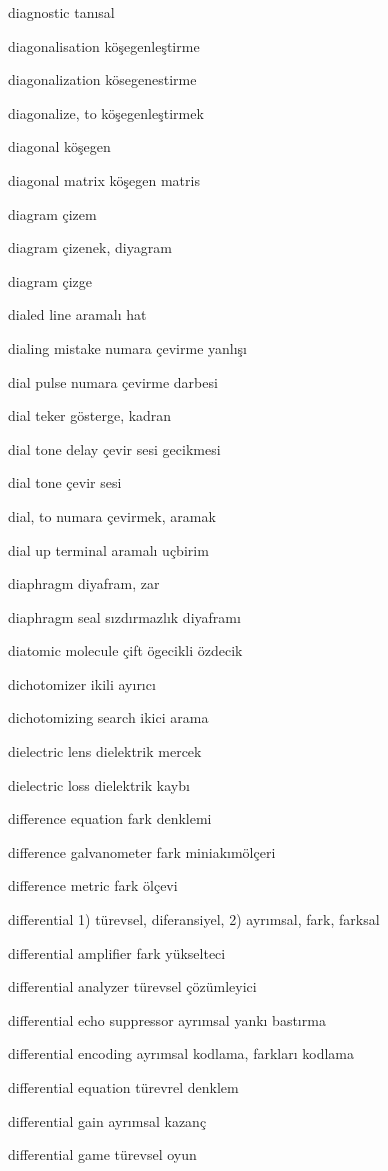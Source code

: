 \documentclass[12pt,fleqn]{article}\usepackage{../../common}
\begin{document}
diagnostic tanısal

diagonalisation köşegenleştirme

diagonalization kösegenestirme

diagonalize, to köşegenleştirmek

diagonal köşegen

diagonal matrix köşegen matris

diagram çizem

diagram çizenek, diyagram

diagram çizge

dialed line aramalı hat

dialing mistake numara çevirme yanlışı

dial pulse numara çevirme darbesi

dial teker gösterge, kadran

dial tone delay çevir sesi gecikmesi

dial tone çevir sesi

dial, to numara çevirmek, aramak

dial up terminal aramalı uçbirim

diaphragm diyafram, zar

diaphragm seal sızdırmazlık diyaframı

diatomic molecule çift ögecikli özdecik

dichotomizer ikili ayırıcı

dichotomizing search ikici arama

dielectric lens dielektrik mercek

dielectric loss dielektrik kaybı

difference equation fark denklemi

difference galvanometer fark miniakımölçeri

difference metric fark ölçevi

differential 1) türevsel, diferansiyel, 2) ayrımsal, fark, farksal

differential amplifier fark yükselteci

differential analyzer türevsel çözümleyici

differential echo suppressor ayrımsal yankı bastırma

differential encoding ayrımsal kodlama, farkları kodlama

differential equation türevrel denklem

differential gain ayrımsal kazanç

differential game türevsel oyun
\end{document}
